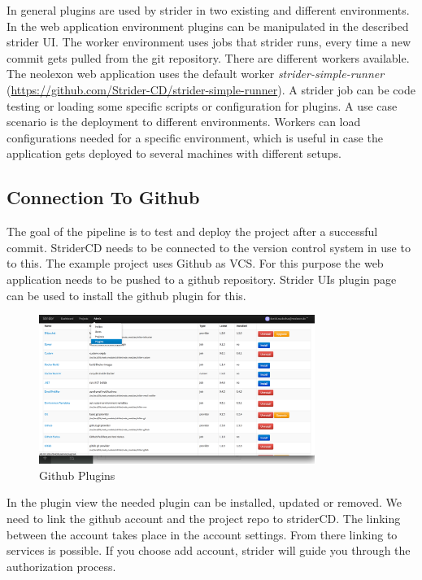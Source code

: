 In general plugins are used by strider in two existing and different environments. In the web application environment plugins can be manipulated
in the described strider UI. The worker environment uses jobs that strider runs, every time a new commit gets pulled from the git
repository. There are different workers available. The neolexon web application uses the default worker \textit{strider-simple-runner}
(\url{https://github.com/Strider-CD/strider-simple-runner}). A strider job can be code testing or loading some specific scripts or
configuration for plugins. A use case scenario is the deployment to different environments. Workers can load configurations needed for
a specific environment, which is useful in case the application gets deployed to several machines with different setups.

\subsection{Connection To Github}
\label{subsection:Connection To Github}
The goal of the pipeline is to test and deploy the project after a successful commit. StriderCD needs to be connected to the version
control system in use to to this. The example project uses Github as VCS. For this purpose the web application needs to be pushed to a github repository.
Strider UIs plugin page can be used to install the github plugin for this.

\begin{figure}[h!]
  \centering
  \includegraphics[width=0.8\textwidth]{images/plugin_page.png}
  \caption{Github Plugins}
\end{figure}

In the plugin view the needed plugin can be installed, updated or removed. We need to link the github account and the project repo to striderCD.
The linking between the account takes place in the account settings. From there linking to services is possible. If you choose add account, strider
will guide you through the authorization process.


